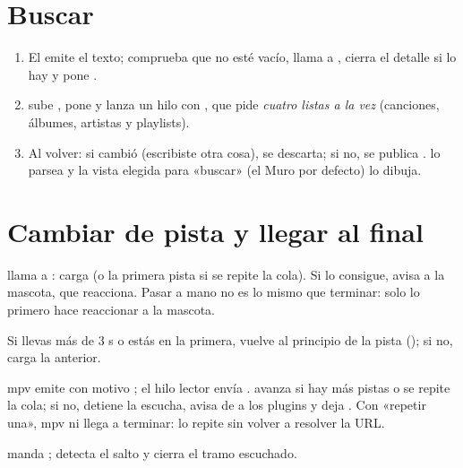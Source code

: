 \section{Buscar}

\begin{enumerate}
  \item El  emite el texto;  comprueba que no esté vacío,
  llama a , cierra el detalle si lo hay y pone .
  \item {} sube , pone  y lanza
  un hilo con , que pide \emph{cuatro listas a la vez} (canciones, álbumes,
  artistas y playlists).
  \item Al volver: si  cambió (escribiste otra cosa), se descarta; si no,
  se publica .  lo parsea y la vista elegida para «buscar»
  (el Muro por defecto) lo dibuja.
\end{enumerate}

\section{Cambiar de pista y llegar al final}

\begin{description}[style=nextline, leftmargin=0pt]
  \item[Pulsar «siguiente»]  llama a : carga 
  (o la primera pista si se repite la cola). Si lo consigue,  avisa a la
  mascota, que reacciona. Pasar a mano no es lo mismo que terminar: solo lo primero hace
  reaccionar a la mascota.
  \item[«Anterior»] Si llevas más de 3 s o estás en la primera, vuelve al principio de la
  pista (); si no, carga la anterior.
  \item[Terminar sola] mpv emite  con motivo ; el hilo lector envía
  .  avanza si hay más pistas o se repite la cola; si no, detiene
  la escucha, avisa de  a los plugins y deja . Con «repetir
  una», mpv ni llega a terminar:  lo repite sin volver a resolver la URL.
  \item[Saltar a otro punto]  manda ; 
  detecta el salto y cierra el tramo escuchado.
\end{description}

